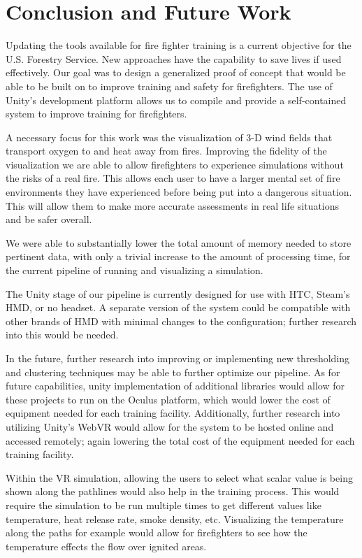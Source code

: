 
\chapter{Conclusion and Future Work} %

\label{Chapter4} %

Updating the tools available for fire fighter training is a current objective for the U.S. Forestry Service. New approaches have the capability to save lives if used effectively. Our goal was to design a generalized proof of concept that would be able to be built on to improve training and safety for firefighters. The use of Unity’s development platform allows us to compile and provide a self-contained system to improve training for firefighters. \par
A necessary focus for this work was the visualization of 3-D wind fields that transport oxygen to and heat away from fires. Improving the fidelity of the visualization we are able to allow firefighters to experience simulations without the risks of a real fire. This allows each user to have a larger mental set of fire environments they have experienced before being put into a dangerous situation. This will allow them to make more accurate assessments in real life situations and be safer overall. \par
We were able to substantially lower the total amount of memory needed to store pertinent data, with only a trivial increase to the amount of processing time, for the current pipeline of running and visualizing a simulation. \par
The Unity stage of our pipeline is currently designed for use with HTC, Steam’s HMD, or no headset. A separate version of the system could be compatible with other brands of HMD with minimal changes to the configuration; further research into this would be needed. \par
In the future, further research into improving or implementing new thresholding and clustering techniques may be able to further optimize our pipeline. As for future capabilities, unity implementation of additional libraries would allow for these projects to run on the Oculus platform, which would lower the cost of equipment needed for each training facility. Additionally, further research into utilizing Unity’s WebVR would allow for the system to be hosted online and accessed remotely; again lowering the total cost of the equipment needed for each training facility. \par
Within the VR simulation, allowing the users to select what scalar value is being shown along the pathlines would also help in the training process. This would require the simulation to be run multiple times to get different values like temperature, heat release rate, smoke density, etc. Visualizing the temperature along the paths for example would allow for firefighters to see how the temperature effects the flow over ignited areas.




